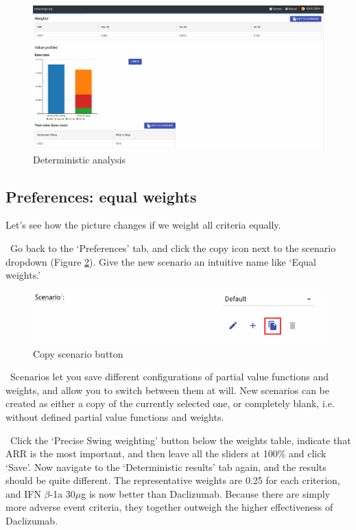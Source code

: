 \documentclass[00_mcda_tutorial.tex]{subfiles}
\begin{document}
\begin{figure}[!h]
    \centering
	\includegraphics[width=\textwidth]{fig/deterministicRanked.png}
    \caption{Deterministic analysis}
	\label{fig:deterministic_ranked}
\end{figure}

\subsection*{Preferences: equal weights}
Let’s see how the picture changes if we weight all criteria equally.
\newline

\noindent \leftpointright \, Go back to the ‘Preferences’ tab, and click the copy icon next to the scenario dropdown (Figure \ref{fig:copy_scenario}). Give the new scenario an intuitive name like ‘Equal weights.’
\newline

\begin{figure}[!h]
    \centering
	\includegraphics[width=.5\textwidth]{fig/copyScenario.png}
    \caption{Copy scenario button}
	\label{fig:copy_scenario}
\end{figure}

\noindent \faGraduationCap \, Scenarios let you save different configurations of partial value functions and weights, and allow you to switch between them at will. New scenarios can be created as either a copy of the currently selected one, or completely blank, i.e. without defined partial value functions  and weights.
\newline

\noindent \leftpointright \, Click the ‘Precise Swing weighting’ button below the weights table, indicate that ARR is the most important, and then leave all the sliders at 100\% and click ‘Save’. Now navigate to the ‘Deterministic results’ tab again, and the results should be quite different. The representative weights are 0.25 for each criterion, and IFN $\beta$-1a 30$\mu$g is now better than Daclizumab. Because there are simply more adverse event criteria, they together outweigh the higher effectiveness of Daclizumab.
\newline
\end{document}
